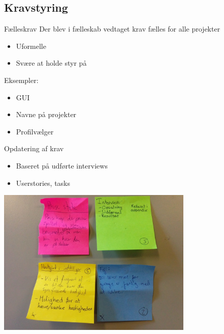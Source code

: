 \subsection{Kravstyring}


\begin{frame}{Fælleskrav}
Der blev i fælleskab vedtaget krav fælles for alle projekter
\begin{itemize}
\item Uformelle 
\item Svære at holde styr på
\end{itemize}

Eksempler:
\begin{itemize}
\item GUI
\item Navne på projekter
\item Profilvælger
\end{itemize}
\end{frame}

\begin{frame}{Opdatering af krav}
\begin{itemize}
\item Baseret på udførte interviews
\item Userstories, tasks
\end{itemize}

\includegraphics[width = 0.7\textwidth]{pgraphics/tasks}
\end{frame}

